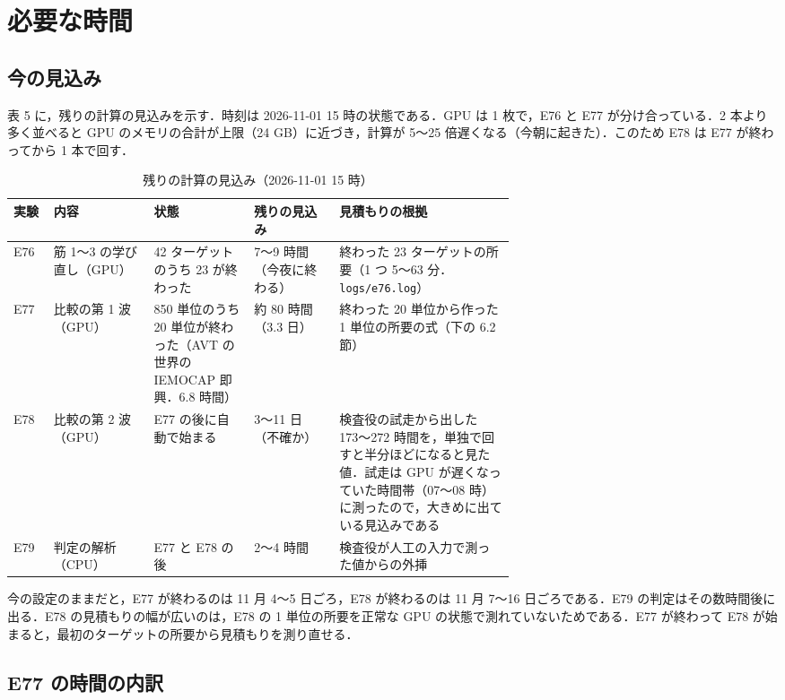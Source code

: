\section{必要な時間}

\subsection{今の見込み}

表 5 に，残りの計算の見込みを示す．時刻は 2026-11-01 15 時の状態である．GPU は 1 枚で，E76 と E77 が分け合っている．2 本より多く並べると GPU のメモリの合計が上限（24 GB）に近づき，計算が 5〜25 倍遅くなる（今朝に起きた）．このため E78 は E77 が終わってから 1 本で回す．

\begin{table}[h]
\centering\small
\caption{残りの計算の見込み（2026-11-01 15 時）}
\begin{tabularx}{\linewidth}{@{}p{0.08\linewidth}p{0.2\linewidth}p{0.2\linewidth}p{0.17\linewidth}L@{}}
\toprule
実験 & 内容 & 状態 & 残りの見込み & 見積もりの根拠 \\
\midrule
E76 & 筋 1〜3 の学び直し（GPU） & 42 ターゲットのうち 23 が終わった & 7〜9 時間（今夜に終わる） & 終わった 23 ターゲットの所要（1 つ 5〜63 分．\texttt{logs/e76.log}） \\
E77 & 比較の第 1 波（GPU） & 850 単位のうち 20 単位が終わった（AVT の世界の IEMOCAP 即興．6.8 時間） & 約 80 時間（3.3 日） & 終わった 20 単位から作った 1 単位の所要の式（下の 6.2 節） \\
E78 & 比較の第 2 波（GPU） & E77 の後に自動で始まる & 3〜11 日（不確か） & 検査役の試走から出した 173〜272 時間を，単独で回すと半分ほどになると見た値．試走は GPU が遅くなっていた時間帯（07〜08 時）に測ったので，大きめに出ている見込みである \\
E79 & 判定の解析（CPU） & E77 と E78 の後 & 2〜4 時間 & 検査役が人工の入力で測った値からの外挿 \\
\bottomrule
\end{tabularx}
\end{table}

今の設定のままだと，E77 が終わるのは 11 月 4〜5 日ごろ，E78 が終わるのは 11 月 7〜16 日ごろである．E79 の判定はその数時間後に出る．E78 の見積もりの幅が広いのは，E78 の 1 単位の所要を正常な GPU の状態で測れていないためである．E77 が終わって E78 が始まると，最初のターゲットの所要から見積もりを測り直せる．

\subsection{E77 の時間の内訳}

